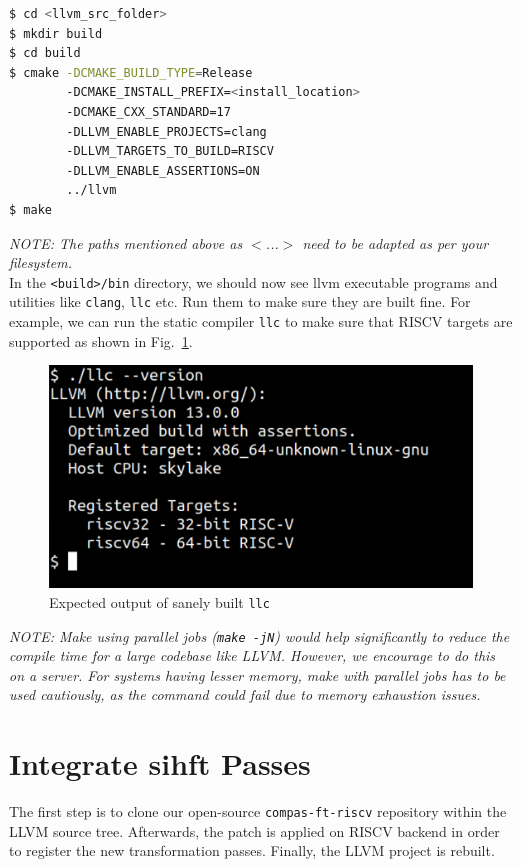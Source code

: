\begin{framed}
 \begin{lstlisting}[language=bash, basicstyle=\small\ttfamily]
$ cd <llvm_src_folder>
$ mkdir build
$ cd build
$ cmake -DCMAKE_BUILD_TYPE=Release
        -DCMAKE_INSTALL_PREFIX=<install_location>
        -DCMAKE_CXX_STANDARD=17
        -DLLVM_ENABLE_PROJECTS=clang
        -DLLVM_TARGETS_TO_BUILD=RISCV
        -DLLVM_ENABLE_ASSERTIONS=ON 
        ../llvm
$ make
  \end{lstlisting}
\end{framed}

\textit{NOTE: The paths mentioned above as $<$...$>$ need to be adapted as per your filesystem.} \\

In the \texttt{<build>/bin} directory, we should now see llvm executable programs and utilities like
\texttt{clang}, \texttt{llc} etc. Run them to make sure they are built fine. For example, we can run the
static compiler \texttt{llc} to make sure that RISCV targets are supported as shown in Fig.~\ref{fig:llc}. \\

\begin{figure}[tb]
 \centering
 \includegraphics[width=\linewidth]{figs/llc.pdf}
 \caption{Expected output of sanely built \texttt{llc}}
 \label{fig:llc}
\end{figure}

\textit{NOTE: Make using parallel jobs (\texttt{make -jN}) would help significantly to reduce the compile time
 for a large codebase like LLVM. However, we encourage to do this on a server. For systems having lesser memory, make
 with parallel jobs has to be used cautiously, as the command could fail due to memory exhaustion issues.}

\newpage
\section{Integrate \ac{sihft} Passes}
The first step is to clone our open-source \texttt{compas-ft-riscv} repository within the LLVM source tree. Afterwards,
the patch is applied on RISCV backend in order to register the new transformation passes. Finally, the LLVM project
is rebuilt.

